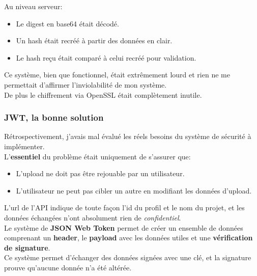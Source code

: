 \documentclass{report}
\begin{document}
          Au niveau serveur:\\

          \begin{itemize}
            \item Le digest en base64 était décodé.
            \item Un hash était recréé à partir des données en clair.
            \item Le hash reçu était comparé à celui recréé pour validation.\\
          \end{itemize}

          Ce système, bien que fonctionnel, était extrêmement lourd et rien ne me permettait d'affirmer l'inviolabilité de mon système.\\
          De plus le chiffrement via OpenSSL était complètement inutile.\\

        \subsubsection{JWT, la bonne solution}
        \label{subs:JWT, la bonne solution}

          Rétrospectivement, j'avais mal évalué les réels besoins du système de sécurité à implémenter.\\

          L'\textbf{essentiel} du problème était uniquement de s'assurer que:\\

          \begin{itemize}
            \item L'upload ne doit pas être rejouable par un utilisateur.
            \item L'utilisateur ne peut pas cibler un autre en modifiant les données d'upload.\\
          \end{itemize}

          L'url de l'API indique de toute façon l'id du profil et le nom du projet, et les données échangées n'ont absolument rien de \textit{confidentiel}.\\

          Le système de \textbf{JSON Web Token} permet de créer un ensemble de données comprenant un \textbf{header}, le \textbf{payload}
          avec les données utiles et une \textbf{vérification de signature}.\\
          Ce système permet d'échanger des données signées avec une clé, et la signature prouve qu'aucune donnée n'a été altérée.\\
\end{document}
